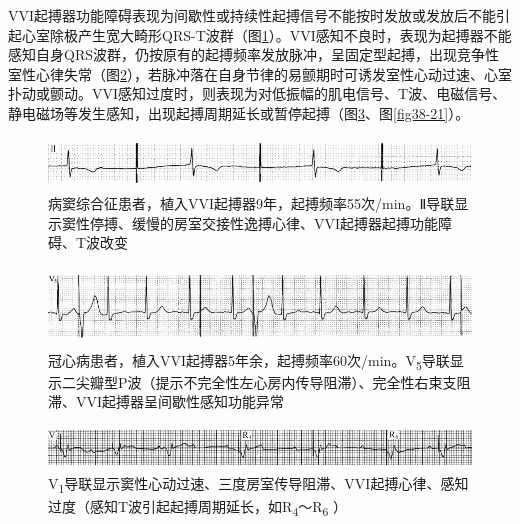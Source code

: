 VVI起搏器功能障碍表现为间歇性或持续性起搏信号不能按时发放或发放后不能引起心室除极产生宽大畸形QRS-T波群（图\ref{fig38-18}）。VVI感知不良时，表现为起搏器不能感知自身QRS波群，仍按原有的起搏频率发放脉冲，呈固定型起搏，出现竞争性室性心律失常（图\ref{fig38-19}），若脉冲落在自身节律的易颤期时可诱发室性心动过速、心室扑动或颤动。VVI感知过度时，则表现为对低振幅的肌电信号、T波、电磁信号、静电磁场等发生感知，出现起搏周期延长或暂停起搏（图\ref{fig38-20}、图\ref{fig38-21}）。

\begin{figure}[!htbp]
 \centering
 \includegraphics[width=5.58333in,height=0.54167in]{./images/Image00621.jpg}
 \captionsetup{justification=centering}
 \caption{病窦综合征患者，植入VVI起搏器9年，起搏频率55次/min。Ⅱ导联显示窦性停搏、缓慢的房室交接性逸搏心律、VVI起搏器起搏功能障碍、T波改变}
 \label{fig38-18}
  \end{figure} 

\begin{figure}[!htbp]
 \centering
 \includegraphics[width=5.58333in,height=0.82292in]{./images/Image00622.jpg}
 \captionsetup{justification=centering}
 \caption{冠心病患者，植入VVI起搏器5年余，起搏频率60次/min。V\textsubscript{5}导联显示二尖瓣型P波（提示不完全性左心房内传导阻滞）、完全性右束支阻滞、VVI起搏器呈间歇性感知功能异常}
 \label{fig38-19}
  \end{figure} 


\begin{figure}[!htbp]
 \centering
 \includegraphics[width=5.58333in,height=0.45833in]{./images/Image00623.jpg}
 \captionsetup{justification=centering}
 \caption{V\textsubscript{1}导联显示窦性心动过速、三度房室传导阻滞、VVI起搏心律、感知过度（感知T波引起起搏周期延长，如R\textsubscript{4}～R\textsubscript{6} ）}
 \label{fig38-20}
  \end{figure} 


